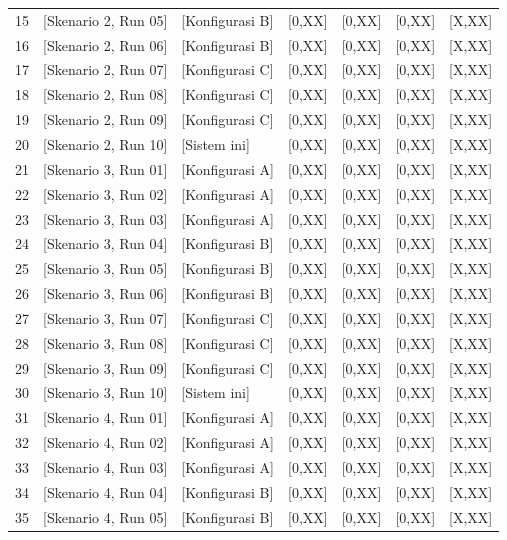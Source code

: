 \begin{thesistable}
\begin{longtable}{@{}r p{3.5cm} p{2.8cm} r r r r@{}}
  15 & [Skenario 2, Run 05] & [Konfigurasi B] & [0,XX] & [0,XX] & [0,XX] & [X,XX] \\
  16 & [Skenario 2, Run 06] & [Konfigurasi B] & [0,XX] & [0,XX] & [0,XX] & [X,XX] \\
  17 & [Skenario 2, Run 07] & [Konfigurasi C] & [0,XX] & [0,XX] & [0,XX] & [X,XX] \\
  18 & [Skenario 2, Run 08] & [Konfigurasi C] & [0,XX] & [0,XX] & [0,XX] & [X,XX] \\
  19 & [Skenario 2, Run 09] & [Konfigurasi C] & [0,XX] & [0,XX] & [0,XX] & [X,XX] \\
  20 & [Skenario 2, Run 10] & [Sistem ini]    & [0,XX] & [0,XX] & [0,XX] & [X,XX] \\
  21 & [Skenario 3, Run 01] & [Konfigurasi A] & [0,XX] & [0,XX] & [0,XX] & [X,XX] \\
  22 & [Skenario 3, Run 02] & [Konfigurasi A] & [0,XX] & [0,XX] & [0,XX] & [X,XX] \\
  23 & [Skenario 3, Run 03] & [Konfigurasi A] & [0,XX] & [0,XX] & [0,XX] & [X,XX] \\
  24 & [Skenario 3, Run 04] & [Konfigurasi B] & [0,XX] & [0,XX] & [0,XX] & [X,XX] \\
  25 & [Skenario 3, Run 05] & [Konfigurasi B] & [0,XX] & [0,XX] & [0,XX] & [X,XX] \\
  26 & [Skenario 3, Run 06] & [Konfigurasi B] & [0,XX] & [0,XX] & [0,XX] & [X,XX] \\
  27 & [Skenario 3, Run 07] & [Konfigurasi C] & [0,XX] & [0,XX] & [0,XX] & [X,XX] \\
  28 & [Skenario 3, Run 08] & [Konfigurasi C] & [0,XX] & [0,XX] & [0,XX] & [X,XX] \\
  29 & [Skenario 3, Run 09] & [Konfigurasi C] & [0,XX] & [0,XX] & [0,XX] & [X,XX] \\
  30 & [Skenario 3, Run 10] & [Sistem ini]    & [0,XX] & [0,XX] & [0,XX] & [X,XX] \\
  31 & [Skenario 4, Run 01] & [Konfigurasi A] & [0,XX] & [0,XX] & [0,XX] & [X,XX] \\
  32 & [Skenario 4, Run 02] & [Konfigurasi A] & [0,XX] & [0,XX] & [0,XX] & [X,XX] \\
  33 & [Skenario 4, Run 03] & [Konfigurasi A] & [0,XX] & [0,XX] & [0,XX] & [X,XX] \\
  34 & [Skenario 4, Run 04] & [Konfigurasi B] & [0,XX] & [0,XX] & [0,XX] & [X,XX] \\
  35 & [Skenario 4, Run 05] & [Konfigurasi B] & [0,XX] & [0,XX] & [0,XX] & [X,XX] \\

\end{longtable}
\end{thesistable}
